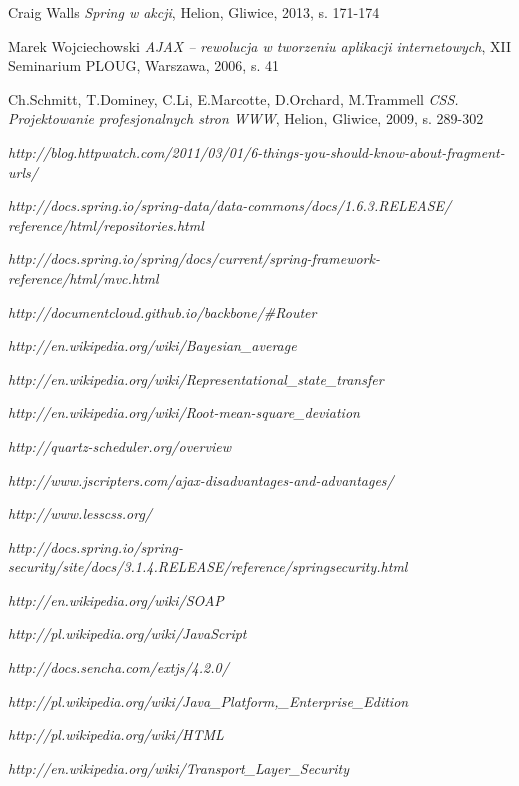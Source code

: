 \begin{thebibliography}{99}

	Craig Walls
	\emph{Spring w akcji},
	Helion,
	Gliwice, 2013,
	s. 171-174
	
	Marek Wojciechowski
	\emph{AJAX – rewolucja w tworzeniu aplikacji internetowych},
	XII Seminarium PLOUG,
	Warszawa, 2006,
	s. 41
	
	Ch.Schmitt, T.Dominey, C.Li, E.Marcotte, D.Orchard, M.Trammell
	\emph{CSS. Projektowanie profesjonalnych stron WWW},
	Helion,
	Gliwice, 2009,
	s. 289-302	

	\emph{http://blog.httpwatch.com/2011/03/01/6-things-you-should-know-about-fragment-urls/}

	\emph{http://docs.spring.io/spring-data/data-commons/docs/1.6.3.RELEASE/\\reference/html/repositories.html}

	\emph{http://docs.spring.io/spring/docs/current/spring-framework-reference/html/mvc.html}
	
	\emph{http://documentcloud.github.io/backbone/\#Router}

	\emph{http://en.wikipedia.org/wiki/Bayesian\_average}
	
	\emph{http://en.wikipedia.org/wiki/Representational\_state\_transfer}	
		
	\emph{http://en.wikipedia.org/wiki/Root-mean-square\_deviation}
 
	\emph{http://quartz-scheduler.org/overview}

	\emph{http://www.jscripters.com/ajax-disadvantages-and-advantages/}
	
	\emph{http://www.lesscss.org/}
	
	\emph{http://docs.spring.io/spring-security/site/docs/3.1.4.RELEASE/reference/springsecurity.html}

	\emph{http://en.wikipedia.org/wiki/SOAP}
	
	\emph{http://pl.wikipedia.org/wiki/JavaScript}	

	\emph{http://docs.sencha.com/extjs/4.2.0/}	
	
	\emph{http://pl.wikipedia.org/wiki/Java\_Platform,\_Enterprise\_Edition}	
	
	\emph{http://pl.wikipedia.org/wiki/HTML}	

	\emph{http://en.wikipedia.org/wiki/Transport\_Layer\_Security}		

\end{thebibliography}

